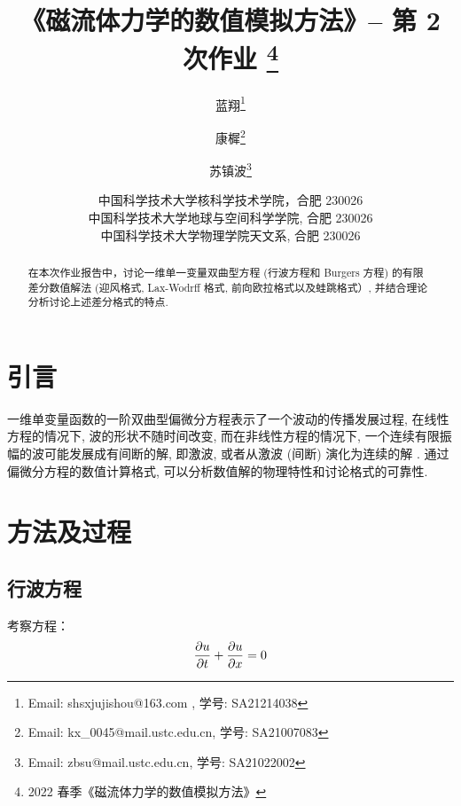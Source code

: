 \documentclass{article}
\begin{document}
\renewcommand{\refname}{参考文献}
\renewcommand{\figurename}{图}
\renewcommand{\abstractname}{摘要}

\title{《磁流体力学的数值模拟方法》-- 第 2 次作业 \footnote{2022 春季《磁流体力学的数值模拟方法》}}


\author{蓝翔\footnote{Email: shsxjujishou@163.com
, 学号: SA21214038}
\and
康樨\footnote{Email: kx\_0045@mail.ustc.edu.cn, 学号: SA21007083}
\and
苏镇波\footnote{Email: zbsu@mail.ustc.edu.cn, 学号: SA21022002}
}

\date{%
\scriptsize%
中国科学技术大学核科学技术学院，合肥 230026\\
中国科学技术大学地球与空间科学学院, 合肥 230026\\
中国科学技术大学物理学院天文系, 合肥 230026
%
}

\maketitle

\begin{abstract}
在本次作业报告中，讨论一维单一变量双曲型方程 (行波方程和 Burgers 方程) 的有限差分数值解法 (迎风格式, Lax-Wodrff 格式, 前向欧拉格式以及蛙跳格式）, 并结合理论分析讨论上述差分格式的特点.
\end{abstract}

\section{引言}
一维单变量函数的一阶双曲型偏微分方程表示了一个波动的传播发展过程, 在线性方程的情况下, 波的形状不随时间改变, 而在非线性方程的情况下, 一个连续有限振幅的波可能发展成有间断的解, 即激波, 或者从激波 (间断) 演化为连续的解 \citep{whitham2011}. 通过偏微分方程的数值计算格式, 可以分析数值解的物理特性和讨论格式的可靠性.
\section{方法及过程}
\subsection{行波方程}\label{xingbo}
考察方程：
\begin{equation}
    {\partial u\over\partial t} + {\partial u\over\partial x} = 0
\end{equation}
\end{document}
